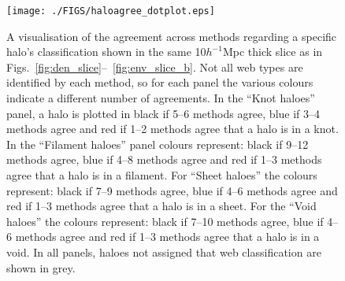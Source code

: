 \documentclass[useAMS,usenatbib]{mnras}
\begin{document}
\begin{figure}
 \texttt{[image: ./FIGS/haloagree\_dotplot.eps]}
 \vspace{-.4cm}
 \caption{A visualisation of the agreement across methods regarding a specific halo's classification shown in the same 10$h^{-1}$Mpc thick slice as in Figs.~\ref{fig:den_slice}--~\ref{fig:env_slice_b}. Not all web types are identified by each method, so for each panel the various colours indicate a different number of agreements. In the ``Knot haloes'' panel, a halo is plotted in black if 5--6 methods agree, blue if 3--4 methods agree and red if 1--2 methods agree that a halo is in a knot. In the ``Filament haloes'' panel colours represent: black if 9--12 methods agree, blue if 4--8 methods agree and red if 1--3 methods agree that a halo is in a filament. For ``Sheet haloes'' the colours represent: black if 7--9 methods agree, blue if 4--6 methods agree and red if 1--3 methods agree that a halo is in a sheet. For the ``Void haloes'' the colours represent: black if 7--10 methods agree, blue if 4--6 methods agree and red if 1--3 methods agree that a halo is in a void. In all panels, haloes not assigned that web classification are shown in grey. }
  \label{fig:halo_agree_dot}
\end{figure}
\end{document}
